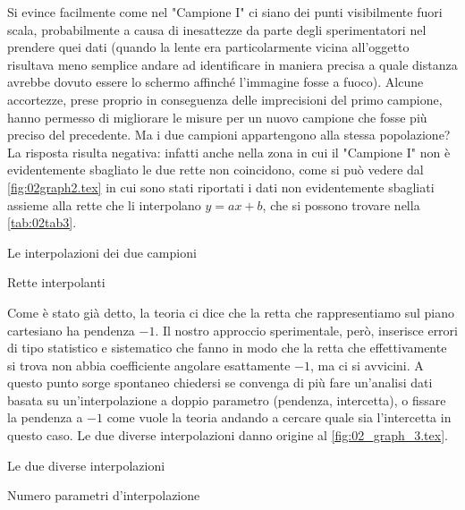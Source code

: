 Si evince facilmente come nel "Campione I" ci siano dei punti visibilmente fuori scala, probabilmente a causa di
 inesattezze da parte degli sperimentatori nel prendere quei dati (quando la lente era particolarmente vicina all'oggetto risultava
 meno semplice andare ad identificare in maniera precisa a quale distanza avrebbe dovuto essere lo schermo affinché l'immagine
 fosse a fuoco). Alcune accortezze, prese proprio in conseguenza delle imprecisioni del primo campione, hanno permesso di migliorare
 le misure per un nuovo campione che fosse più preciso del precedente. Ma i due campioni appartengono alla stessa popolazione? La risposta
 risulta negativa: infatti anche nella zona in cui il "Campione I" non è evidentemente sbagliato le due rette non coincidono,
 come si può vedere dal \autoref{fig:02graph2.tex} in cui sono stati riportati i dati non evidentemente sbagliati assieme alla rette
 che li
 interpolano $y = ax + b$, che si possono trovare nella \autoref{tab:02tab3}.
\begin{grafico} \centering  \caption{Le interpolazioni dei due campioni} \label{fig:02graph2.tex} \end{grafico}
\begin{tabella}
	\centering
	
	\caption{Rette interpolanti}
	\label{tab:02tab3}
\end{tabella}

Come è stato già detto, la teoria ci dice che la retta che rappresentiamo sul piano cartesiano ha pendenza $-1$. Il nostro approccio
 sperimentale, però, inserisce errori di tipo statistico e sistematico che fanno in modo che la retta che effettivamente si trova
 non abbia coefficiente angolare esattamente $-1$, ma ci si avvicini. A questo punto sorge spontaneo chiedersi se convenga di più fare
 un'analisi dati basata su un'interpolazione a doppio parametro (pendenza, intercetta), o fissare la pendenza a $-1$ come vuole la
 teoria andando a cercare quale sia l'intercetta in questo caso. Le due diverse interpolazioni danno origine al
 \autoref{fig:02_graph_3.tex}.
\begin{grafico} \centering  \caption{Le due diverse interpolazioni} \label{fig:02_graph_3.tex} \end{grafico}
\begin{tabella}
	\centering
	
	\caption{Numero parametri d'interpolazione}
	\label{tab:02tab4}
\end{tabella}

